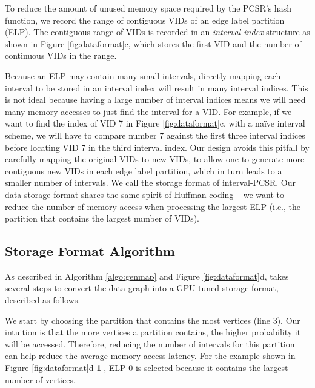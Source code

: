 To reduce the amount of unused memory space required by the PCSR's hash function, we record the range of contiguous VIDs of an edge label
partition (ELP). The contiguous range of VIDs is recorded in an \emph{interval index} structure as shown in Figure \ref{fig:dataformat}c,
which stores the first VID and the number of continuous VIDs in the range.

Because an ELP may contain many small intervals, directly mapping each interval to be stored in an interval index will result in many
interval indices. This is not ideal because having a large number of interval indices means we will need many memory accesses to just find
the interval for a VID. For example, if we want to find the index of VID 7 in Figure \ref{fig:dataformat}c, with a naïve interval scheme,
we will have to compare number 7 against the first three interval indices before locating VID 7 in the third interval index. Our design
avoids this pitfall by carefully mapping the original VIDs to new VIDs, to allow one to generate more contiguous new VIDs in each edge
label partition, which in turn leads to a smaller number of intervals. We call the storage format of \SystemName interval-PCSR. Our data storage format shares the same spirit of Huffman coding \cite{Moffat2019Huffman} – we want to reduce the number of memory access when processing the largest ELP (i.e., the partition that contains the largest number of VIDs).

\subsection{\SystemName Storage Format Algorithm}

 As described in Algorithm \ref{algo:genmap} and Figure \ref{fig:dataformat}d, \SystemName takes several steps to convert the data graph into a GPU-tuned storage format, described as follows.

 We start by choosing the partition that contains the most vertices (line 3). Our intuition is that the more vertices a partition contains, the higher probability it will be accessed. Therefore, reducing the number of intervals for this partition can help reduce the average memory access latency. For the example shown in Figure
\ref{fig:dataformat}d \textbf{\textcircled{1}}, ELP 0 is selected because it contains the largest number of vertices.

